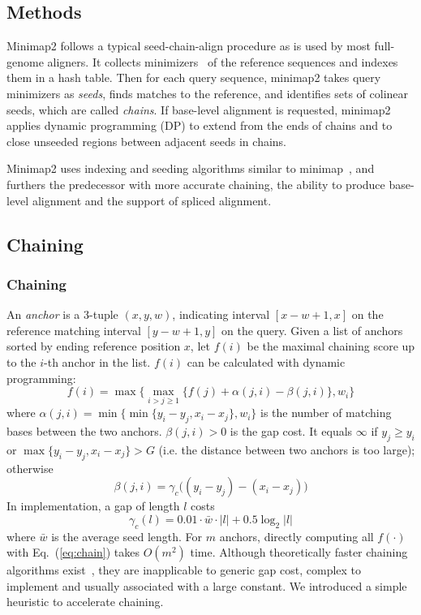 \documentclass{bioinfo}
\begin{document}
\begin{methods}
\section{Methods}

Minimap2 follows a typical seed-chain-align procedure as is used by most
full-genome aligners. It collects minimizers~\citep{Roberts:2004fv} of the
reference sequences and indexes them in a hash table. Then for each query
sequence, minimap2 takes query minimizers as \emph{seeds}, finds matches to the
reference, and identifies sets of colinear seeds, which are called
\emph{chains}. If base-level alignment is requested, minimap2 applies dynamic
programming (DP) to extend from the ends of chains and to close unseeded
regions between adjacent seeds in chains.

Minimap2 uses indexing and seeding algorithms similar to
minimap~\citep{Li:2016aa}, and furthers the predecessor with more accurate
chaining, the ability to produce base-level alignment and the support of
spliced alignment.

\subsection{Chaining}

\subsubsection{Chaining}
An \emph{anchor} is a 3-tuple $(x,y,w)$, indicating interval $[x-w+1,x]$ on the
reference matching interval $[y-w+1,y]$ on the query. Given a list of anchors
sorted by ending reference position $x$, let $f(i)$ be the maximal chaining
score up to the $i$-th anchor in the list. $f(i)$ can be calculated with
dynamic programming:
\begin{equation}\label{eq:chain}
f(i)=\max\big\{\max_{i>j\ge 1} \{ f(j)+\alpha(j,i)-\beta(j,i) \},w_i\big\}
\end{equation}
where $\alpha(j,i)=\min\big\{\min\{y_i-y_j,x_i-x_j\},w_i\big\}$ is the number of
matching bases between the two anchors. $\beta(j,i)>0$ is the gap cost. It
equals $\infty$ if $y_j\ge y_i$ or $\max\{y_i-y_j,x_i-x_j\}>G$ (i.e. the
distance between two anchors is too large); otherwise
\begin{equation}\label{eq:chain-gap}
\beta(j,i)=\gamma_c\big((y_i-y_j)-(x_i-x_j)\big)
\end{equation}
In implementation, a gap of length $l$ costs
\[
\gamma_c(l)=0.01\cdot \bar{w}\cdot|l|+0.5\log_2|l|
\]
where $\bar{w}$ is the average seed length. For $m$ anchors, directly computing all $f(\cdot)$ with
Eq.~(\ref{eq:chain}) takes $O(m^2)$ time. Although theoretically faster
chaining algorithms exist~\citep{Abouelhoda:2005aa}, they
are inapplicable to generic gap cost, complex to implement and usually
associated with a large constant. We introduced a simple heuristic to
accelerate chaining.


\end{methods}
\end{document}
